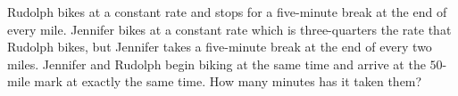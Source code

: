 Rudolph bikes at a constant rate and stops for a five-minute break at the end of every mile. Jennifer bikes at a constant rate which is three-quarters the rate that Rudolph bikes, but Jennifer takes a five-minute break at the end of every two miles. Jennifer and Rudolph begin biking at the same time and arrive at the $50$-mile mark at exactly the same time. How many minutes has it taken them?
